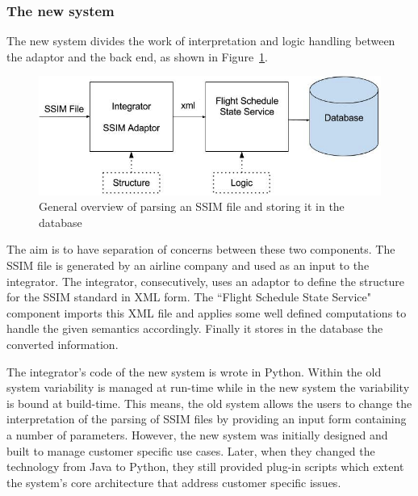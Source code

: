 \subsubsection{The new system}
The new system divides the work of interpretation and logic handling between the adaptor and the back end, as shown in Figure~\ref{fig:newSystem}.  

\begin{figure}[h]
\centering
\includegraphics[width=\columnwidth]{figure/Figure2.png}

\caption{ General overview of parsing an SSIM file and storing it in the database}
\label{fig:newSystem}
\end{figure}


The aim is to have separation of concerns between these two components. The SSIM file is generated by an airline company and used as an input to the integrator. The integrator, consecutively, uses an adaptor to define the structure for the SSIM standard in XML form. The ``Flight Schedule State Service" component imports this XML file and applies some well defined computations to handle the given semantics accordingly. Finally it stores in the database the converted information. 

The integrator's code of the new system is wrote in Python. 
Within the old system variability is managed at run-time while in the new system the variability is bound at build-time. This means, the old system allows the users to change the interpretation of the parsing of SSIM files by providing an input form containing a number of parameters. However, the new system was initially designed and built to manage customer specific use cases. Later, when they changed the technology from Java to Python, they still provided plug-in scripts which extent the system's core architecture that address customer specific issues. 

